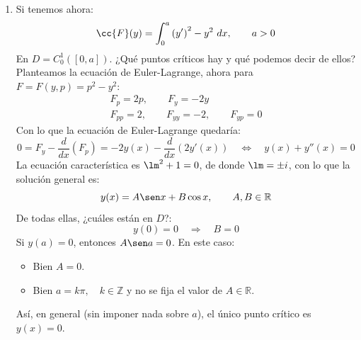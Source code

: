 \begin{ejemplo}
\begin{enumerate}
            Solucionando la ecuación de Jacobi, la solución general es:
            \begin{equation*}
                \varphi(x) = c_1 + c_2x, \qquad c_1,c_2\in \mathbb{R}
            \end{equation*}
            Imponiendo $\varphi(x_0) = 0$ ($x_0 = 0$ y $x_1 = 1$):
            \begin{equation*}
                0 = \varphi(x_0) = c_1  \quad\Longleftrightarrow\quad c_1 = 0
            \end{equation*}
            Ahora, ¿existe $\overline{x}>0$ tal que $\varphi(\overline{x}) = 0$? Como debemos tener $c_2\neq 0$ para tener $\varphi\not\equiv 0$ no, por lo que $x_0$ no tiene puntos conjugados en $\left]x_0,x_1\right]$. 

            Así, aplicando el Teorema anterior obtenemos que $y(x) = x$ es, efectivamente, un mínimo local estricto de la función $\cc{F}$.

        \item Si tenemos ahora:
            \begin{equation*}
                \cc{F}(y) = \int_{0}^{a} {(y')}^{2}-y^2~dx , \qquad a>0
            \end{equation*}
            En $D = C^1_0([0,a])$. ¿Qué puntos críticos hay y qué podemos decir de ellos?\\

            \noindent
            Planteamos la ecuación de Euler-Lagrange, ahora para $F=F(y,p) = p^2 - y^2$:
            \begin{gather*}
                F_p = 2p, \qquad F_y = -2y \\
                F_{pp} = 2, \qquad F_{yy} = -2, \qquad F_{yp} = 0
            \end{gather*}
            Con lo que la ecuación de Euler-Lagrange quedaría:
            \begin{equation*}
                0 = F_y - \frac{d}{dx}(F_p) = -2y(x) - \frac{d}{dx}(2y'(x)) \quad\Longleftrightarrow\quad y(x) + y''(x) = 0
            \end{equation*}
            La ecuación característica es $\lm^2 + 1 = 0$, de donde $\lm = \pm i$, con lo que la solución general es:
            \begin{equation*}
                y(x) = A\sen x + B\cos x, \qquad A,B\in \mathbb{R}
            \end{equation*}
            De todas ellas, ¿cuáles están en $D$?:
            \begin{equation*}
                y(0) = 0 \quad\Longrightarrow\quad B = 0 
            \end{equation*}
            Si $y(a) = 0$, entonces $A\sen a = 0$. En este caso:
            \begin{itemize}
                \item Bien $A=0$.
                \item Bien $a = k\pi, \quad k\in \mathbb{Z}$ y no se fija el valor de $A\in \mathbb{R}$.
            \end{itemize}
            Así, en general (sin imponer nada sobre $a$), el único punto crítico es $y(x) = 0$. 


\end{enumerate}
\end{ejemplo}
